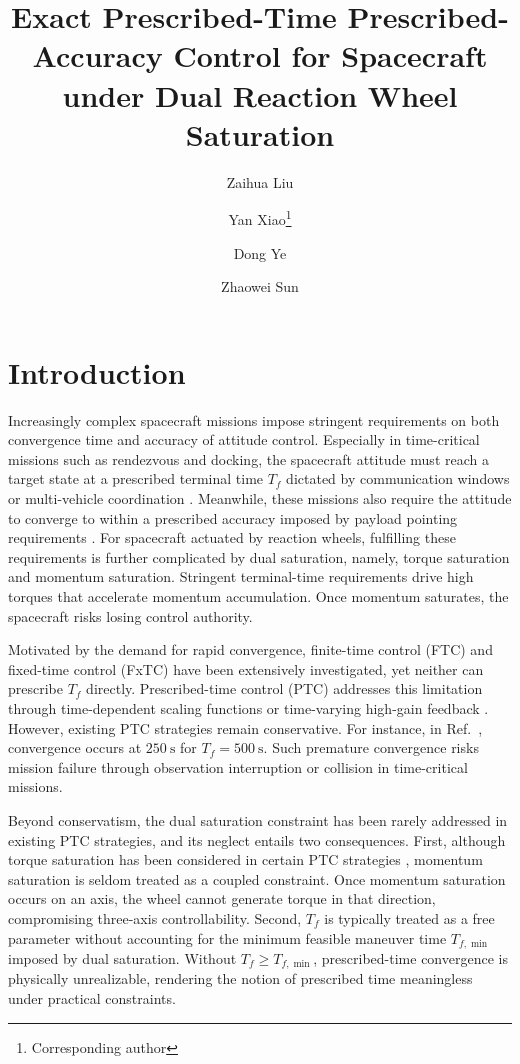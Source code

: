 \documentclass[journal]{new-aiaa}
\title{Exact Prescribed-Time Prescribed-Accuracy Control for Spacecraft under Dual Reaction Wheel Saturation}
\author[1,2]{Zaihua Liu}
\author[1,2]{Yan Xiao\footnote{Corresponding author}}
\author[1,2]{Dong Ye}
\author[1,2]{Zhaowei Sun}
\affil[1]{Research Center of Satellite Technology, Harbin Institute of Technology, Harbin 150001, China}
\affil[2]{State Key Laboratory of Micro-Spacecraft Rapid Design and Intelligent Cluster, Harbin Institute of Technology, Harbin 150001, China}
\begin{document}
\maketitle

\section{Introduction}

Increasingly complex spacecraft missions impose stringent requirements on
both convergence time and accuracy of attitude control.
Especially in time-critical missions such as rendezvous and docking,
the spacecraft attitude must reach a target state at a prescribed
terminal time $T_f$ dictated by communication windows or multi-vehicle coordination
\cite{alex_pothen_pose_2022, das_predefined-time_2024, xu_distributed_2024}.
Meanwhile, these missions also require the attitude to converge to within a prescribed
accuracy imposed by payload pointing requirements
\cite{xiao_attitude_2020,ye_predefined-time_2022,xiao_quantitative_2025}.
For spacecraft actuated by reaction wheels, fulfilling these requirements is further
complicated by dual saturation, namely, torque saturation and
momentum saturation.
Stringent terminal-time requirements drive high torques that accelerate
momentum accumulation.
Once momentum saturates, the spacecraft risks losing control authority.

Motivated by the demand for rapid convergence, finite-time control (FTC) and
fixed-time control (FxTC)
\cite{hong_finite-time_2006,zhao_adaptive_2018,shi_finite-time_2017,
polyakov_nonlinear_2012,polyakov_finite-time_2015,delValleFixtime2025}
have been extensively investigated, yet neither can prescribe $T_f$ directly.
Prescribed-time control (PTC)
\cite{sanchez-torres_predefined-time_2015,song_time-varying_2017}
addresses this limitation through time-dependent scaling functions
\cite{sanchez-torres_class_2018,xiao_predefined-time_2025}
or time-varying high-gain feedback
\cite{zhou_finite-time_2020,cao_practical_2022,xiao_scaling_2025}.
However, existing PTC strategies remain conservative.
For instance, in Ref.~\cite{xu_distributed_2024}, convergence occurs at
$250~\mathrm{s}$ for $T_f=500~\mathrm{s}$.
Such premature convergence risks mission failure through observation
interruption or collision in time-critical missions.

Beyond conservatism, the dual saturation constraint has been rarely addressed
in existing PTC strategies, and its neglect entails two consequences.
First, although torque saturation has been considered in certain PTC strategies
\cite{sun_attitude_2024,xu_distributed_2022,zhao_exponential_2024},
momentum saturation is seldom treated as a coupled constraint.
Once momentum saturation occurs on an axis, the wheel cannot generate torque
in that direction, compromising three-axis controllability.
Second, $T_f$ is typically treated as a free parameter
without accounting for the minimum feasible maneuver time $T_{f,\min}$
imposed by dual saturation.
Without $T_f \ge T_{f,\min}$,
prescribed-time convergence is physically unrealizable,
rendering the notion of prescribed time meaningless under practical constraints.
\end{document}
